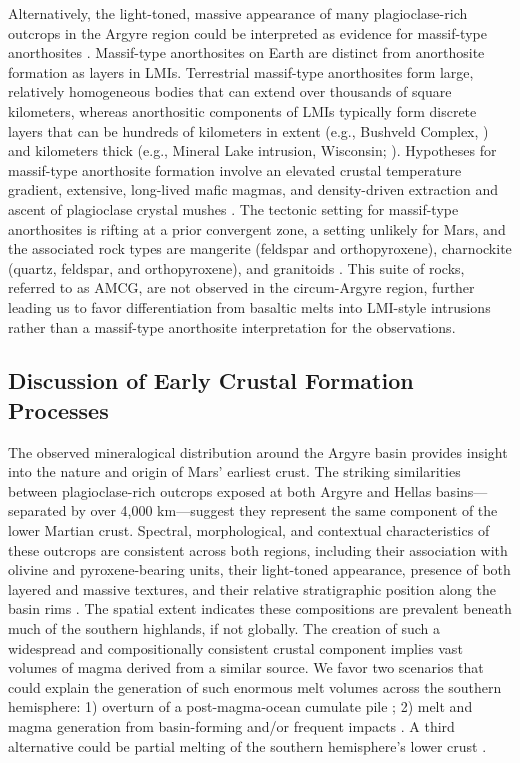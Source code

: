 \documentclass[12pt]{article}
\begin{document}
Alternatively, the light-toned, massive appearance of many plagioclase-rich outcrops in the Argyre region could be interpreted as evidence for massif-type anorthosites \citep{Ashwal1993, Arndt2013, Keller2024}. Massif-type anorthosites on Earth are distinct from anorthosite formation as layers in LMIs. Terrestrial massif-type anorthosites form large, relatively homogeneous bodies that can extend over thousands of square kilometers, whereas anorthositic components of LMIs typically form discrete layers that can be hundreds of kilometers in extent (e.g., Bushveld Complex, \citealt{Latypov2020}) and kilometers thick (e.g., Mineral Lake intrusion, Wisconsin; \citealt{Ashwal1993}). Hypotheses for massif-type anorthosite formation involve an elevated crustal temperature gradient, extensive, long-lived mafic magmas, and density-driven extraction and ascent of plagioclase crystal mushes \citep{Emslie1994, Keller2024}. The tectonic setting for massif-type anorthosites is rifting at a prior convergent zone, a setting unlikely for Mars, and the associated rock types are mangerite (feldspar and orthopyroxene), charnockite (quartz, feldspar, and orthopyroxene), and granitoids \citep{Emslie1994, Hamilton2010, Arndt2013, Keller2024}. This suite of rocks, referred to as AMCG, are not observed in the circum-Argyre region, further leading us to favor differentiation from basaltic melts into LMI-style intrusions rather than a massif-type anorthosite interpretation for the observations.

\subsection*{Discussion of Early Crustal Formation Processes}

The observed mineralogical distribution around the Argyre basin provides insight into the nature and origin of Mars' earliest crust. The striking similarities between plagioclase-rich outcrops exposed at both Argyre and Hellas basins---separated by over 4,000 km---suggest they represent the same component of the lower Martian crust. Spectral, morphological, and contextual characteristics of these outcrops are consistent across both regions, including their association with olivine and pyroxene-bearing units, their light-toned appearance, presence of both layered and massive textures, and their relative stratigraphic position along the basin rims \citep{Phillips2022}. The spatial extent indicates these compositions are prevalent beneath much of the southern highlands, if not globally. The creation of such a widespread and compositionally consistent crustal component implies vast volumes of magma derived from a similar source. We favor two scenarios that could explain the generation of such enormous melt volumes across the southern hemisphere: 1) overturn of a post-magma-ocean cumulate pile \citep{Borg2003, Elkins-Tanton2005}; 2) melt and magma generation from basin-forming and/or frequent impacts \citep{Koeppel2020, Manske2021, Black2024}. A third alternative could be partial melting of the southern hemisphere's lower crust \citep{BonnetGibet2025, Bernadet2025}.
\end{document}
